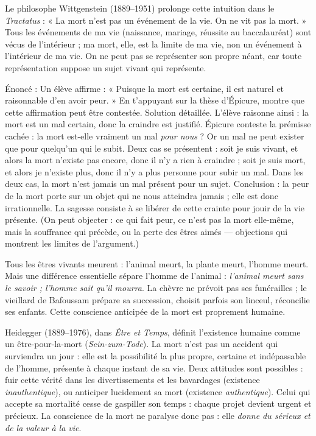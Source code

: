 \documentclass[11pt]{article}
\newcommand{\cle}[1]{{\popxbold\color{popdark}#1}}
\newcounter{popsec}
\newcounter{popsub}
\newcommand{\courssub}[1]{%
  \stepcounter{popsub}%
  \par\vspace{9pt}\noindent{\popxbold\fontsize{11.5}{13}\selectfont\color{popink}{\color{poporange}\thepopsec.\thepopsub}\hspace{6pt}#1}\par\nopagebreak\vspace{4pt}
}
\begin{document}
Le philosophe Wittgenstein (1889--1951) prolonge cette intuition dans le \emph{Tractatus} : « La mort n'est pas un événement de la vie. On ne vit pas la mort. » Tous les événements de ma vie (naissance, mariage, réussite au baccalauréat) sont vécus de l'intérieur ; ma mort, elle, est la limite de ma vie, non un événement à l'intérieur de ma vie. On ne peut pas se représenter son propre néant, car toute représentation suppose un sujet vivant qui représente.

\begin{exoresolu}
Énoncé : Un élève affirme : « Puisque la mort est certaine, il est naturel et raisonnable d'en avoir peur. » En t'appuyant sur la thèse d'Épicure, montre que cette affirmation peut être contestée.
\tcblower
Solution détaillée. L'élève raisonne ainsi : la mort est un mal certain, donc la craindre est justifié. Épicure conteste la prémisse cachée : la mort est-elle vraiment un mal \emph{pour nous} ? Or un mal ne peut exister que pour quelqu'un qui le subit. Deux cas se présentent : soit je suis vivant, et alors la mort n'existe pas encore, donc il n'y a rien à craindre ; soit je suis mort, et alors je n'existe plus, donc il n'y a plus personne pour subir un mal. Dans les deux cas, la mort n'est jamais un mal présent pour un sujet. Conclusion : la peur de la mort porte sur un objet qui ne nous atteindra jamais ; elle est donc irrationnelle. La sagesse consiste à se libérer de cette crainte pour jouir de la vie présente. (On peut objecter : ce qui fait peur, ce n'est pas la mort elle-même, mais la souffrance qui précède, ou la perte des êtres aimés — objections qui montrent les limites de l'argument.)
\end{exoresolu}

\courssub{La conscience de la mort : une spécificité humaine}

Tous les êtres vivants meurent : l'animal meurt, la plante meurt, l'homme meurt. Mais une différence essentielle sépare l'homme de l'animal : \emph{l'animal meurt sans le savoir ; l'homme sait qu'il mourra}. La chèvre ne prévoit pas ses funérailles ; le vieillard de Bafoussam prépare sa succession, choisit parfois son linceul, réconcilie ses enfants. Cette conscience anticipée de la mort est proprement humaine.

\begin{propriete}
Heidegger (1889--1976), dans \emph{Être et Temps}, définit l'existence humaine comme un \cle{être-pour-la-mort} (\emph{Sein-zum-Tode}). La mort n'est pas un accident qui surviendra un jour : elle est la possibilité la plus propre, certaine et indépassable de l'homme, présente à chaque instant de sa vie. Deux attitudes sont possibles : fuir cette vérité dans les divertissements et les bavardages (existence \emph{inauthentique}), ou anticiper lucidement sa mort (existence \emph{authentique}). Celui qui accepte sa mortalité cesse de gaspiller son temps : chaque projet devient urgent et précieux. La conscience de la mort ne paralyse donc pas : elle \emph{donne du sérieux et de la valeur à la vie}.
\end{propriete}
\end{document}
